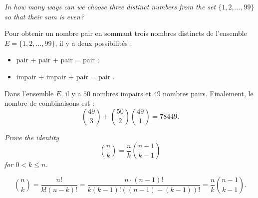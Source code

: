 \begin{description}
   {\itshape In how many ways can we choose three distinct numbers from the set $\{1, 2,\ldots, 99\}$ so that their sum is even?}
    \begin{ex}
      Pour obtenir un nombre pair en sommant trois nombres distincts de l'ensemble $E = \{1, 2, \ldots, 99\}$, il y a deux possibilit\'es :
      \begin{itemize}
        \item pair + pair + pair = pair ;
        \item impair + impair + pair = pair .
      \end{itemize}
      Dans l'ensemble $E$, il y a $50$ nombres impairs et $49$ nombres pairs. Finalement, le nombre de combinaisons est :
      \[ \binom{49}{3} + \binom{50}{2}\binom{49}{1} = 78449.  \]
      
    \end{ex}
   {\itshape Prove the identity \[\binom{n}{k} = \frac{n}{k}\binom{n-1}{k-1}\] for $ 0 < k \le n$.}

    \begin{ex}
      \[ \binom{n}{k} = \frac{n!}{k!(n-k)!} = \frac{n\cdot(n-1)!}{k(k-1)!((n-1)-(k-1))!} = \frac{n}{k}\binom{n-1}{k-1}.\]
    \end{ex}


\end{description}
